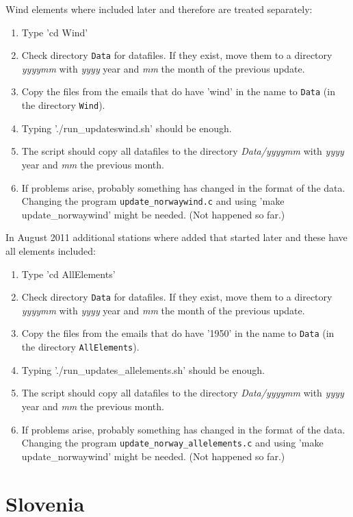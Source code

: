 \documentclass[a4paper]{article}
\begin{document}
\noindent Wind elements where included later and therefore are treated
separately: 
\begin{enumerate}
\item Type 'cd Wind'
\item Check directory \texttt{Data} for datafiles. If they exist, move
  them to a directory \textit{yyyymm} with \textit{yyyy} year and
  \textit{mm} the month of the previous update.
\item Copy the files from the emails that do have 'wind' in the name
  to \texttt{Data} (in the directory \texttt{Wind}).
\item Typing './run\_updateswind.sh' should be enough.
\item The script should copy all datafiles to the directory
  \textit{Data/yyyymm} with \textit{yyyy} year and \textit{mm} the
  previous month.
\item If problems arise, probably something has changed in the format
  of the data. Changing the program \texttt{update\_norwaywind.c} and
  using 'make update\_norwaywind' might be needed. (Not happened so
  far.)
\end{enumerate}


\noindent In August 2011 additional stations where added that started
later and these have all elements included:
\begin{enumerate}
\item Type 'cd AllElements'
\item Check directory \texttt{Data} for datafiles. If they exist, move
  them to a directory \textit{yyyymm} with \textit{yyyy} year and
  \textit{mm} the month of the previous update.
\item Copy the files from the emails that do have '1950' in the name
  to \texttt{Data} (in the directory \texttt{AllElements}).
\item Typing './run\_updates\_allelements.sh' should be enough.
\item The script should copy all datafiles to the directory
  \textit{Data/yyyymm} with \textit{yyyy} year and \textit{mm} the
  previous month.
\item If problems arise, probably something has changed in the format
  of the data. Changing the program
  \texttt{update\_norway\_allelements.c} and using 'make
  update\_norwaywind' might be needed. (Not happened so far.)
\end{enumerate}



\section{Slovenia}
\end{document}
